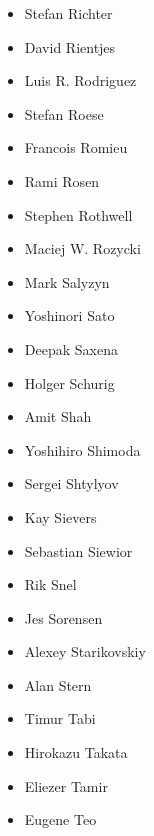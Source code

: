 \documentclass[a4paper,8pt,english]{sphinxmanual}
\begin{document}
\begin{itemize}
\item {} 
Stefan Richter

\item {} 
David Rientjes

\item {} 
Luis R. Rodriguez

\item {} 
Stefan Roese

\item {} 
Francois Romieu

\item {} 
Rami Rosen

\item {} 
Stephen Rothwell

\item {} 
Maciej W. Rozycki

\item {} 
Mark Salyzyn

\item {} 
Yoshinori Sato

\item {} 
Deepak Saxena

\item {} 
Holger Schurig

\item {} 
Amit Shah

\item {} 
Yoshihiro Shimoda

\item {} 
Sergei Shtylyov

\item {} 
Kay Sievers

\item {} 
Sebastian Siewior

\item {} 
Rik Snel

\item {} 
Jes Sorensen

\item {} 
Alexey Starikovskiy

\item {} 
Alan Stern

\item {} 
Timur Tabi

\item {} 
Hirokazu Takata

\item {} 
Eliezer Tamir

\item {} 
Eugene Teo


\end{itemize}
\end{document}
